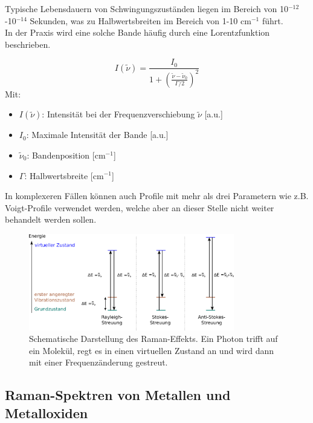 Typische Lebensdauern von Schwingungszuständen liegen im Bereich von 10$^{-12}$-10$^{-14}$ Sekunden, was zu Halbwertsbreiten im Bereich von 1-10 cm$^{-1}$ führt.\\
In der Praxis wird eine solche Bande häufig durch eine Lorentzfunktion beschrieben.

\begin{equation}
    I(\tilde{\nu}) = \frac{I_0}{1 + \left(\frac{\tilde{\nu} - \tilde{\nu}_0}{\Gamma/2}\right)^2}
\end{equation}
Mit:
\begin{itemize}
    \item $I(\tilde{\nu})$: Intensität bei der Frequenzverschiebung $\tilde{\nu}$ [a.u.]
    \item $I_0$: Maximale Intensität der Bande [a.u.]
    \item $\tilde{\nu}_0$: Bandenposition  [cm$^{-1}$]
    \item $\Gamma$: Halbwertsbreite [cm$^{-1}$]
\end{itemize}

In komplexeren Fällen können auch Profile mit mehr als drei Parametern wie z.B. Voigt-Profile verwendet werden, welche aber an dieser Stelle nicht weiter behandelt werden sollen.

\begin{figure}[H]
    \centering
    \includegraphics[width=0.8\textwidth]{1_Skript/Inkscape/Raman.png}
    \caption{Schematische Darstellung des Raman-Effekts. Ein Photon trifft auf ein Molekül, regt es in einen virtuellen Zustand an und wird dann mit einer Frequenzänderung gestreut.}
    \label{fig:Raman}
\end{figure}


\subsection{Raman-Spektren von Metallen und Metalloxiden}

